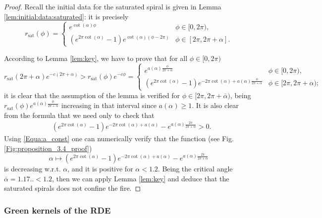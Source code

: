 \documentclass[reqno]{amsart}
\newcounter{assu}
\theoremstyle{definition} \newtheorem{definition}{Definition}[section]
\theoremstyle{definition} \newtheorem{remark}[definition]{Remark}
\theoremstyle{plain} \newtheorem{lemma}[definition]{Lemma}
\theoremstyle{plain} \newtheorem{proposition}[definition]{Proposition}
\theoremstyle{plain} \newtheorem{theorem}[definition]{Theorem}
\theoremstyle{plain} \newtheorem{corollary}[definition]{Corollary}
\theoremstyle{definition} \newtheorem{example}[definition]{Example}
\theoremstyle{plain} \newtheorem{claim}[clai]{Claim}
\theoremstyle{definition} \newtheorem{assumption}[definition]{Assumption}
\theoremstyle{definition} \newtheorem{observation}[definition]{Observation}
\newcommand{\1}{\mathbbm 1}
\numberwithin{equation}{section} %
\theoremstyle{plain} \newtheorem*{theorem*}{Theorem}
\theoremstyle{plain} \newtheorem{mthm}[maintheorem]{Main Theorem}
\theoremstyle{plain} \newtheorem*{mthm*}{Main Theorem}
\theoremstyle{plain} \newtheorem*{conjecture*}{Conjecture}
\theoremstyle{plain} \newtheorem{conjecture}[definition]{Conjecture}
\theoremstyle{plain} \newtheorem*{problem*}{Problem}
\begin{document}
\begin{proof}
Recall the initial data for the saturated spiral is given in Lemma \ref{lem:initial:data:saturated}: it is precisely
\begin{equation*}
r_\mathrm{sat}(\phi) = \begin{cases}
e^{\cot(\alpha) \phi} & \phi \in [0,2\pi), \\
(e^{2\pi \cot(\alpha)} - 1) e^{\cot(\alpha) (\phi-2\pi)} & \phi \in [2\pi,2\pi + \alpha].
\end{cases}
\end{equation*}

According to Lemma \ref{lem:key}, we have to prove that for all $\phi \in [0,2\pi)$
\begin{equation*}
r_\mathrm{sat}(2\pi + \alpha) e^{-c (2\pi + \alpha)} > r_\mathrm{sat}(\phi) e^{-c \phi} = \begin{cases}
e^{a(\alpha) \frac{\phi}{2\pi+\alpha}} & \phi \in [0,2\pi), \\
(e^{2\pi \cot(\alpha)} - 1) e^{- 2\pi \cot(\alpha) + a(\alpha) \frac{\phi}{2\pi+\alpha}} & \phi \in [2\pi,2\pi + \alpha);
\end{cases}
\end{equation*}
it is clear that the assumption of the lemma is verified for $\phi \in [2\pi,2\pi+\bar \alpha)$, being $r_\mathrm{sat}(\phi) e^{a(\alpha) \frac{\phi}{2\pi + \alpha}}$ increasing in that interval since $a(\alpha) \geq 1$. It is also clear from the formula that we need only to check that
\begin{align*}
&(e^{2\pi \cot(\alpha)} - 1) e^{- 2\pi \cot(\alpha) + a(\alpha)} - e^{a(\alpha) \frac{2\pi}{2\pi + \alpha}} > 0.
\end{align*}
Using \eqref{Equa:a_const} one can numerically verify that the function (see Fig. \ref{Fig:proposition_3.4_proof})
\begin{equation}
\label{Equa:intern_prop_3.4}
\alpha \mapsto (e^{2\pi \cot(\alpha)} - 1) e^{- 2\pi \cot(\alpha) + a(\alpha)} - e^{a(\alpha) \frac{2\pi}{2\pi + \alpha}}
\end{equation}
is decreasing w.r.t. $\alpha$, and it is positive for $\alpha < 1.2$. Being the critical angle $\bar \alpha = 1.17.. < 1.2$, then we can apply Lemma \ref{lem:key} and deduce that the saturated spirals does not confine the fire.
\end{proof}


\subsubsection{Green kernels of the RDE}
\label{Sss:green_kernels}
\end{document}
